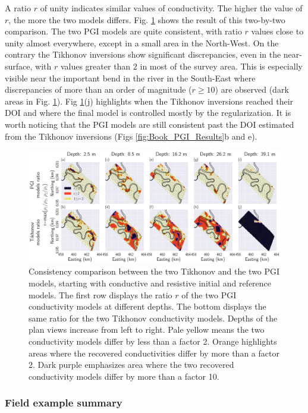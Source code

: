 \documentclass[extra]{gji} %
\begin{document}
A ratio $r$ of unity indicates similar values of conductivity. The higher the value of $r$, the more the two models differs. Fig. \ref{Booky_compare} shows the result of this two-by-two comparison. The two PGI models are quite consistent, with ratio $r$ values close to unity almost everywhere, except in a small area in the North-West. On the contrary the Tikhonov inversions show significant discrepancies, even in the near-surface, with $r$ values greater than $2$ in most of the survey area. This is especially visible near the important bend in the river in the South-East where discrepancies of more than an order of magnitude ($r\geq10$) are observed (dark areas in Fig. \ref{Booky_compare}). Fig \ref{Booky_compare}(j) highlights when the Tikhonov inversions reached their DOI and where the final model is controlled mostly by the regularization. It is worth noticing that the PGI models are still consistent past the DOI estimated from the Tikhonov inversions (Figs \ref{fig:Book_PGI_Results}b and e).

\begin{figure}
\centering
\includegraphics[width=\textwidth]{./Fig/LowRes/Booky_ratio_compare.png}
\caption[]{Consistency comparison between the two Tikhonov and the two PGI models, starting with conductive and resistive initial and reference models. The first row displays the ratio $r$ of the two PGI conductivity models at different depths. The bottom displays the same ratio for the two Tikhonov conductivity models. Depths of the plan views increase from left to right. Pale yellow means the two conductivity models differ by less than a factor 2. Orange highlights areas where the recovered conductivities differ by more than a factor 2. Dark purple emphasizes area where the two  recovered conductivity models differ by more than a factor 10.}
\label{Booky_compare}
\end{figure}

\subsubsection{Field example summary}
\end{document}
